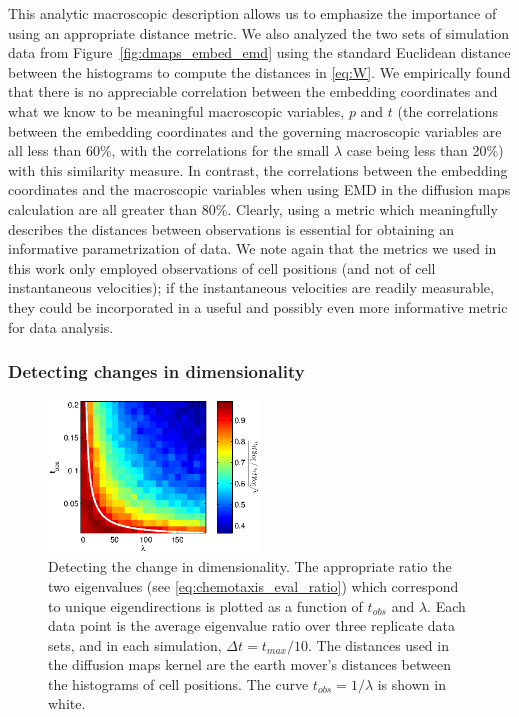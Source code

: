 \documentclass[3p]{elsarticle}
\begin{document}

This analytic macroscopic description allows us to emphasize the importance of using an appropriate distance metric.
%
We also analyzed the two sets of simulation data from Figure~\ref{fig:dmaps_embed_emd} using the standard 
Euclidean distance between the histograms to compute the distances in \eqref{eq:W}.
%
We empirically found that there is no appreciable correlation between the embedding 
coordinates and what we know to be meaningful macroscopic variables, $p$ and $t$ (the correlations between the embedding 
coordinates and the governing macroscopic variables are all less than 60\%, with the correlations for 
the small $\lambda$ case being less than 20\%) with this similarity measure.
%
In contrast, the correlations between the embedding coordinates and the macroscopic variables when using EMD in the diffusion maps 
calculation are all greater than 80\%.
%
Clearly, using a metric which meaningfully describes the distances between observations 
is essential for obtaining an informative parametrization of data.
%
We note again that the metrics we used in this work only employed observations of cell positions (and not of cell instantaneous
velocities); if the instantaneous velocities are readily measurable, they could be incorporated in a useful
and possibly even more informative metric for data analysis.

\subsubsection{Detecting changes in dimensionality}

\begin{figure}[t]
%
\centering
\includegraphics[width=0.5\textwidth]{tmax_lambda_transition}
%
\caption{Detecting the change in dimensionality. The appropriate ratio the two eigenvalues (see \eqref{eq:chemotaxis_eval_ratio}) which correspond to unique eigendirections is plotted as a function of $t_{obs}$ and $\lambda$. Each data point is the average eigenvalue ratio over three replicate data sets, and in each simulation, $\Delta t=t_{max}/10$. The distances used in the diffusion maps kernel are the earth mover's distances between the histograms of cell positions. The curve $t_{obs} = 1/\lambda$ is shown in white. }
%
\label{fig:chemotaxis_compare_timescales_evals}
%
\end{figure}
\end{document}
